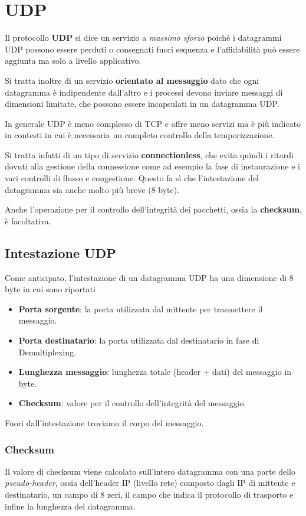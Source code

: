 \section{UDP}
Il protocollo \textbf{UDP} si dice un servizio a \emph{massimo sforzo} poiché i datagrammi UDP
possono essere perduti o consegnati fuori sequenza e l'affidabilità può essere aggiunta ma solo a 
livello applicativo.

Si tratta inoltre di un servizio \textbf{orientato al messaggio} dato che ogni datagramma è 
indipendente dall'altro e i processi devono inviare messaggi di dimensioni limitate, che possono
essere incapsulati in un datagramma UDP.

In generale UDP è meno complesso di TCP e offre meno servizi ma è più indicato in contesti in cui
è necessaria un completo controllo della temporizzazione.

Si tratta infatti di un tipo di servizio \textbf{connectionless}, che evita quindi i ritardi 
dovuti alla gestione della connessione come ad esempio la fase di instaurazione e i vari controlli
di flusso e congestione. Questo fa sì che l'intestazione del datagramma sia anche molto più breve
(8 byte).

Anche l'operazione per il controllo dell'integrità dei pacchetti, ossia la \textbf{checksum}, è 
facoltativa.

\subsection{Intestazione UDP}
Come anticipato, l'intestazione di un datagramma UDP ha una dimensione di 8 byte in cui sono
riportati
\begin{itemize}
	\item \textbf{Porta sorgente}: la porta utilizzata dal mittente per trasmettere il messaggio.
	\item \textbf{Porta destinatario}: la porta utilizzata dal destinatario in fase di 
		Demultiplexing.
	\item \textbf{Lunghezza messaggio}: lunghezza totale (header + dati) del messaggio in byte.
	\item \textbf{Checksum}: valore per il controllo dell'integrità del messaggio.
\end{itemize}
Fuori dall'intestazione troviamo il corpo del messaggio.

\subsubsection{Checksum}
Il valore di checksum viene calcolato sull'intero datagramma con una parte dello 
\emph{pseudo-header}, ossia dell'header IP (livello rete) composto dagli IP di mittente e 
destinatario, un campo di 8 zeri, il campo che indica il protocollo di trasporto e infine la 
lunghezza del datagramma.

